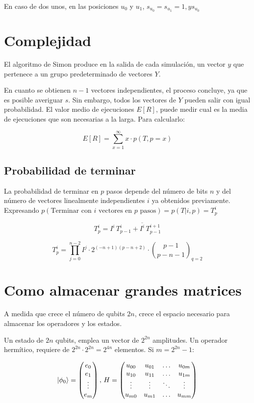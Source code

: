 \documentclass{article}
\newcommand*\mat[1]{ \begin{pmatrix} #1 \end{pmatrix}}
\theoremstyle{definition}
\begin{document}
En caso de dos unos, en las posiciones $u_0$ y $u_1$, $s_{u_0} = s_{u_1} = 1, y 
s_{u_0}$

\section{Complejidad}

El algoritmo de Simon produce en la salida de cada simulación, un vector $y$ que
pertenece a un grupo predeterminado de vectores $Y$.

En cuanto se obtienen $n-1$ vectores independientes, el proceso concluye, ya que
es posible averiguar $s$. Sin embargo, todos los vectores de $Y$ pueden salir
con igual probabilidad. El valor medio de ejecuciones $E[R]$, puede medir cual
es la media de ejecuciones que son necesarias a la larga. Para calcularlo:

$$ E[R] = \sum^{\infty}_{x=1} x \cdot p(T, p=x) $$

\subsection{Probabilidad de terminar}

La probabilidad de terminar en $p$ pasos depende del número de bits $n$ y del 
número de vectores linealmente independientes $i$ ya obtenidos previamente.  
Expresando $p(\textrm{Terminar con $i$ vectores en $p$ pasos}) = p(T|i,p) = 
T^i_p$ 

$$T^i_p = I^i \, T^i_{p-1} + \overline{I^i} \, T^{i+1}_{p-1}$$

$$ T^i_p = \prod^{n-2}_{j=0} I^j \cdot 2^{(-n+1)(p-n+2)} \cdot {p-1 \choose 
p-n-1}_{q=2} $$

\section{Como almacenar grandes matrices}
A medida que crece el número de qubits $2n$, crece el espacio necesario para 
almacenar los operadores y los estados.

Un estado de $2n$ qubits, emplea un vector de $2^{2n}$ amplitudes. Un operador 
hermítico, requiere de $2^{2n} \cdot 2^{2n} = 2^{4n}$ elementos. Si $m = 
2^{2n}-1$:

$$ \ket{\phi_0} = \mat{e_0 \\ e_1 \\ \vdots \\ e_m},\, H =
	\mat{ u_{00} & u_{01} & \ldots & u_{0m} \\
		u_{10} & u_{11} & \ldots & u_{1m}\\
		\vdots & \vdots & \ddots & \vdots \\
		u_{m0} & u_{m1} & \ldots & u_{mm}\\
	}
$$
\end{document}
